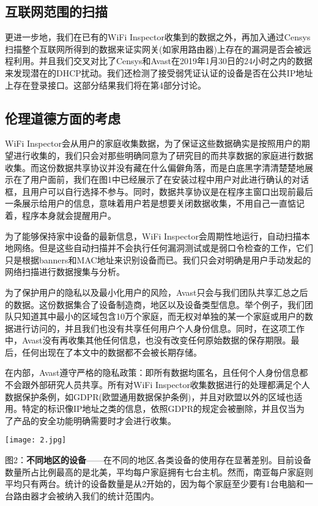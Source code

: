 \documentclass[UTF8]{ctexart}
\begin{document}
	\subsection{互联网范围的扫描}
	更进一步地，我们在已有的WiFi Inspector收集到的数据之外，再加入通过Censys扫描整个互联网所得到的数据来证实网关(如家用路由器)上存在的漏洞是否会被远程利用。并且我们交叉对比了Censys和Avast在2019年1月30日的24小时之内的数据来发现潜在的DHCP扰动。我们还检测了接受弱凭证认证的设备是否在公共IP地址上存在登录接口。这部分结果我们将在第4部分讨论。
	
	\subsection{伦理道德方面的考虑}
	WiFi Inspector会从用户的家庭收集数据，为了保证这些数据确实是按照用户的期望进行收集的，我们只会对那些明确同意为了研究目的而共享数据的家庭进行数据收集。而这份数据共享协议并没有藏在什么偏僻角落，而是白底黑字清清楚楚地展示在了用户面前，我们在图1中已经展示了在安装过程中用户对此进行确认的对话框，且用户可以自行选择不参与。同时，数据共享协议是在程序主窗口出现前最后一条展示给用户的信息，意味着用户若是想要关闭数据收集，不用自己一直惦记着，程序本身就会提醒用户。
	
	为了能够保持家中设备的最新信息，WiFi Inspector会周期性地运行，自动扫描本地网络。但是这些自动扫描并不会执行任何漏洞测试或是弱口令检查的工作，它们只是根据banners和MAC地址来识别设备而已。我们只会对明确是用户手动发起的网络扫描进行数据搜集与分析。
	
	为了保护用户的隐私以及最小化用户的风险，Avast只会与我们团队共享汇总之后的数据。这份数据集合了设备制造商，地区以及设备类型信息。举个例子，我们团队只知道其中最小的区域包含10万个家庭，而无权对单独的某一个家庭或用户的数据进行访问的，并且我们也没有共享任何用户个人身份信息。同时，在这项工作中，Avast没有再收集其他任何信息，也没有改变任何原始数据的保存期限。最后，任何出现在了本文中的数据都不会被长期存储。
	
	在内部，Avast遵守严格的隐私政策：即所有数据均匿名，且任何个人身份信息都不会跟外部研究人员共享。所有对WiFi Inspector收集数据进行的处理都满足个人数据保护条例，如GDPR(欧盟通用数据保护条例)，并且对欧盟以外的区域也适用。特定的标识像IP地址之类的信息，依照GDPR的规定会被删除，并且仅当为了产品的安全功能明确需要时才会进行收集。
	
	\texttt{[image: 2.jpg]}
	\begin{center}
		图2：\textbf{不同地区的设备}——在不同的地区,各类设备的使用存在显著差别。目前设备数量所占比例最高的是北美，平均每户家庭拥有七台主机。然而，南亚每户家庭则平均只有两台。统计的设备数量是从2开始的，因为每个家庭至少要有1台电脑和一台路由器才会被纳入我们的统计范围内。
	\end{center}
\end{document}
